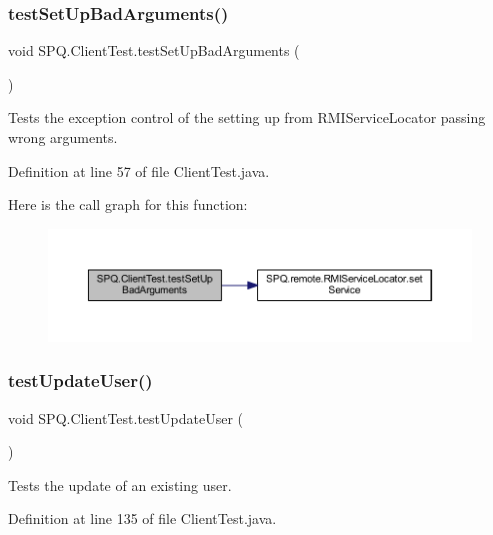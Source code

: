 \subsubsection{\texorpdfstring{test\+Set\+Up\+Bad\+Arguments()}{testSetUpBadArguments()}}
{\footnotesize\ttfamily void S\+P\+Q.\+Client\+Test.\+test\+Set\+Up\+Bad\+Arguments (\begin{DoxyParamCaption}{ }\end{DoxyParamCaption})}

Tests the exception control of the setting up from R\+M\+I\+Service\+Locator passing wrong arguments. 

Definition at line 57 of file Client\+Test.\+java.

Here is the call graph for this function\+:\nopagebreak
\begin{figure}[H]
\begin{center}
\leavevmode
\includegraphics[width=350pt]{class_s_p_q_1_1_client_test_add97afff5978c2f1b8e950cc4942eda5_cgraph}
\end{center}
\end{figure}
\mbox{\label{class_s_p_q_1_1_client_test_ab6d14403cd66b3b0ab32f8022902588f}} 
\subsubsection{\texorpdfstring{test\+Update\+User()}{testUpdateUser()}}
{\footnotesize\ttfamily void S\+P\+Q.\+Client\+Test.\+test\+Update\+User (\begin{DoxyParamCaption}{ }\end{DoxyParamCaption})}

Tests the update of an existing user. 

Definition at line 135 of file Client\+Test.\+java.

